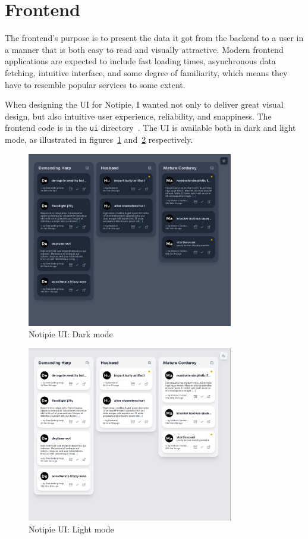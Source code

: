 \section{Frontend}\label{sec:frontend}

The frontend's purpose is to present the data
it got from the backend to a user
in a manner that is both easy to read
and visually attractive.
Modern frontend applications
are expected to include
fast loading times,
asynchronous data fetching,
intuitive interface,
and some degree of familiarity,
which means they have to resemble
popular services to some extent.

When designing the \ac{UI} for Notipie,
I wanted not only to deliver great visual design,
but also intuitive user experience,
reliability,
and snappiness.
The frontend code
is in the
\texttt{ui} directory~\cite{sewera_notipie_2022-5}.
The \ac{UI} is available both in dark and light mode,
as illustrated in figures~\ref{fig:notipie-ui-dark}
and~\ref{fig:notipie-ui-light} respectively.

\begin{figure}[h]
  \centering
  \includegraphics[width=9cm,keepaspectratio]{img/notipie_dark.jpg}
  \caption{Notipie UI: Dark mode}
  \label{fig:notipie-ui-dark}
\end{figure}

\begin{figure}[h]
  \centering
  \includegraphics[width=9cm,keepaspectratio]{img/notipie_light.jpg}
  \caption{Notipie UI: Light mode}
  \label{fig:notipie-ui-light}
\end{figure}

